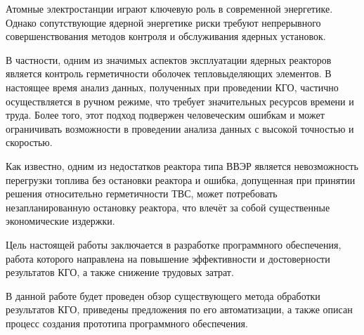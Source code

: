 
Атомные электростанции играют ключевую роль в современной
энергетике. Однако сопутствующие ядерной энергетике риски требуют
непрерывного совершенствования методов контроля и обслуживания ядерных установок.

В частности, одним из значимых аспектов эксплуатации ядерных реакторов является контроль герметичности оболочек тепловыделяющих
элементов. В настоящее время анализ данных, полученных при проведении
КГО, частично осуществляется в ручном режиме, что требует значительных ресурсов времени и труда. Более того, этот подход подвержен человеческим ошибкам и может ограничивать возможности в проведении анализа данных с высокой точностью и скоростью.

Как известно, одним из недостатков реактора типа ВВЭР является
невозможность перегрузки топлива без остановки реактора и ошибка,
допущенная при принятии решения относительно герметичности ТВС, может
потребовать незапланированную остановку реактора, что влечёт за собой
существенные экономические издержки.

Цель настоящей работы заключается в разработке программного обеспечения, работа которого направлена на повышение эффективности
и достоверности результатов КГО, а также снижение трудовых затрат.

В данной работе будет проведен обзор существующего метода обработки результатов КГО, приведены предложения по его автоматизации, а также описан процесс создания прототипа программного обеспечения.
